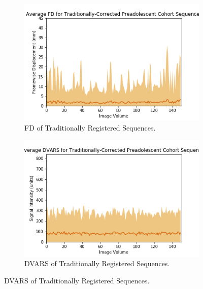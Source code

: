 \begin{figure}[]
	\begin{subfigure}{0.4\textwidth}
		\centering
		\includegraphics[width=1.0\textwidth]{6/figures/preads-trad-fd-150.png}
		\caption{FD of Traditionally Registered Sequences.}
	\end{subfigure}
	\hspace{0.05\textwidth}
	\begin{subfigure}{0.4\textwidth}
		\centering
		\includegraphics[width=1.0\textwidth]{6/figures/preads-trad-dvars-150.png}
		\caption{DVARS of Traditionally Registered Sequences.}
	\end{subfigure}
	

\end{figure}

